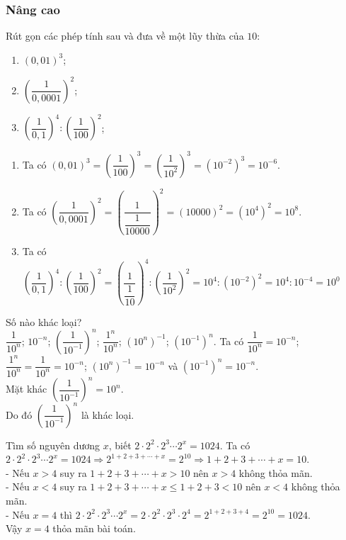 \subsubsection{Nâng cao}
\begin{bt}%
	Rút gọn các phép tính sau và đưa về một lũy thừa của $10$:
	\begin{enumerate}
		\item $\left(0{,}01\right)^3$;
		\item $\left(\dfrac{1}{0{,}0001}\right)^{2}$;
		\item $\left(\dfrac{1}{0{,}1}\right)^{4}\colon \left(\dfrac{1}{100}\right)^{2}$;
	\end{enumerate}
	\loigiai
	{\begin{enumerate}
			\item Ta có  $\left(0{,}01\right)^3 = \left(\dfrac{1}{100}\right)^3 = \left(\dfrac{1}{10^2}\right)^3 = \left(10^{-2}\right)^3 = 10^{-6}$.
			\item Ta có $\left(\dfrac{1}{0{,}0001}\right)^{2} = \left(\dfrac{1}{\dfrac{1}{10000}}\right)^{2} = \left(10000\right)^{2} = \left(10^4\right)^2 = 10^8$.
			\item Ta có $\left(\dfrac{1}{0{,}1}\right)^{4}\colon \left(\dfrac{1}{100}\right)^{2} = \left(\dfrac{1}{\dfrac{1}{10}}\right)^{4}\colon \left(\dfrac{1}{10^2}\right)^{2} = 10^4\colon \left(10^{-2}\right)^2 = 10^4\colon 10^{- 4} = 10^{0}$
		\end{enumerate}
	}
\end{bt}

\begin{bt}%
	Số nào khác loại?\\
	$\dfrac{1}{10^n}$; $10^{- n}$; $\left(\dfrac{1}{10^{-1}}\right)^{n}$; $\dfrac{1^n}{10^n}$; $\left(10^n\right)^{-1}$; $\left(10^{- 1}\right)^{n}$.
	\loigiai
	{Ta có $\dfrac{1}{10^n} = 10^{- n}$; $\dfrac{1^n}{10^n} = \dfrac{1}{10^{n}} = 10^{-n}$; $\left(10^n\right)^{-1} = 10^{- n}$ và  $\left(10^{- 1}\right)^{n} = 10^{- n}$.\\
		Mặt khác $\left(\dfrac{1}{10^{-1}}\right)^{n} = 10^{n}$.\\
		Do đó  	$\left(\dfrac{1}{10^{-1}}\right)^{n}$ là khác loại.
	}
\end{bt}


\begin{bt}%
	Tìm số nguyên dương $x$, biết $2\cdot 2^2\cdot 2^3\cdots 2^{x} = 1024$.
	\loigiai
	{Ta có $2\cdot 2^2\cdot 2^3\cdots 2^{x} = 1024\Rightarrow 2^{1  + 2 + 3 + \cdots + x} = 2^{10}\Rightarrow 1 + 2 + 3 + \cdots + x = 10$.\\
		- Nếu $x > 4$ suy ra $1 + 2 + 3 + \cdots + x > 10$ nên $x > 4$ không thỏa mãn.\\
		- Nếu $x < 4$ suy ra $1 + 2 + 3 + \cdots + x\leq 1 + 2 + 3 < 10$ nên $x < 4$ không thỏa mãn.\\
		- Nếu $x = 4$ thì $2\cdot 2^2\cdot 2^3\cdots 2^{x} =  2\cdot 2^2\cdot 2^3\cdot 2^{4} = 2^{1 + 2 + 3 + 4} = 2^{10} = 1024$.\\
		Vậy $x = 4$ thỏa mãn bài toán.
	}
\end{bt}

